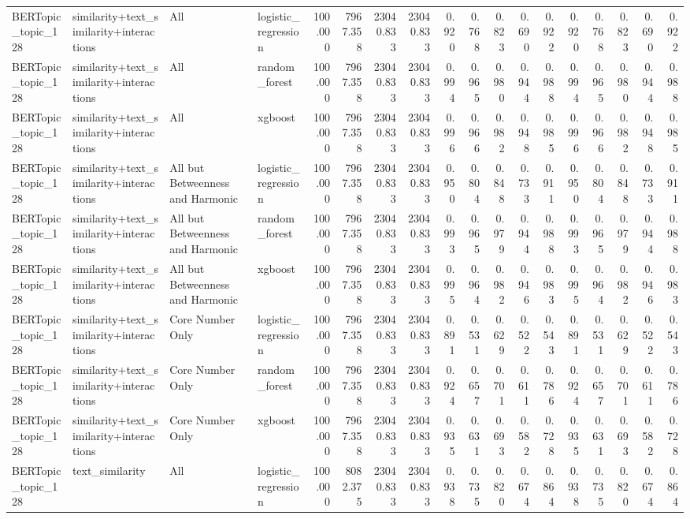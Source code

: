 \begin{tabular}{llllrrrrrrrrrrrrrr}
BERTopic_topic_128 & similarity+text_similarity+interactions & All & logistic_regression & 100.000 & 7967.358 & 23040.833 & 23040.833 & 0.920 & 0.768 & 0.823 & 0.690 & 0.922 & 0.920 & 0.768 & 0.823 & 0.690 & 0.922 \\
BERTopic_topic_128 & similarity+text_similarity+interactions & All & random_forest & 100.000 & 7967.358 & 23040.833 & 23040.833 & 0.994 & 0.965 & 0.980 & 0.944 & 0.988 & 0.994 & 0.965 & 0.980 & 0.944 & 0.988 \\
BERTopic_topic_128 & similarity+text_similarity+interactions & All & xgboost & 100.000 & 7967.358 & 23040.833 & 23040.833 & 0.996 & 0.966 & 0.982 & 0.948 & 0.985 & 0.996 & 0.966 & 0.982 & 0.948 & 0.985 \\
BERTopic_topic_128 & similarity+text_similarity+interactions & All but Betweenness and Harmonic & logistic_regression & 100.000 & 7967.358 & 23040.833 & 23040.833 & 0.950 & 0.804 & 0.848 & 0.733 & 0.911 & 0.950 & 0.804 & 0.848 & 0.733 & 0.911 \\
BERTopic_topic_128 & similarity+text_similarity+interactions & All but Betweenness and Harmonic & random_forest & 100.000 & 7967.358 & 23040.833 & 23040.833 & 0.993 & 0.965 & 0.979 & 0.944 & 0.988 & 0.993 & 0.965 & 0.979 & 0.944 & 0.988 \\
BERTopic_topic_128 & similarity+text_similarity+interactions & All but Betweenness and Harmonic & xgboost & 100.000 & 7967.358 & 23040.833 & 23040.833 & 0.995 & 0.964 & 0.982 & 0.946 & 0.983 & 0.995 & 0.964 & 0.982 & 0.946 & 0.983 \\
BERTopic_topic_128 & similarity+text_similarity+interactions & Core Number Only & logistic_regression & 100.000 & 7967.358 & 23040.833 & 23040.833 & 0.891 & 0.531 & 0.629 & 0.522 & 0.543 & 0.891 & 0.531 & 0.629 & 0.522 & 0.543 \\
BERTopic_topic_128 & similarity+text_similarity+interactions & Core Number Only & random_forest & 100.000 & 7967.358 & 23040.833 & 23040.833 & 0.924 & 0.657 & 0.701 & 0.611 & 0.786 & 0.924 & 0.657 & 0.701 & 0.611 & 0.786 \\
BERTopic_topic_128 & similarity+text_similarity+interactions & Core Number Only & xgboost & 100.000 & 7967.358 & 23040.833 & 23040.833 & 0.935 & 0.631 & 0.693 & 0.582 & 0.728 & 0.935 & 0.631 & 0.693 & 0.582 & 0.728 \\
BERTopic_topic_128 & text_similarity & All & logistic_regression & 100.000 & 8082.375 & 23040.833 & 23040.833 & 0.938 & 0.735 & 0.820 & 0.674 & 0.864 & 0.938 & 0.735 & 0.820 & 0.674 & 0.864 \\

\end{tabular}
